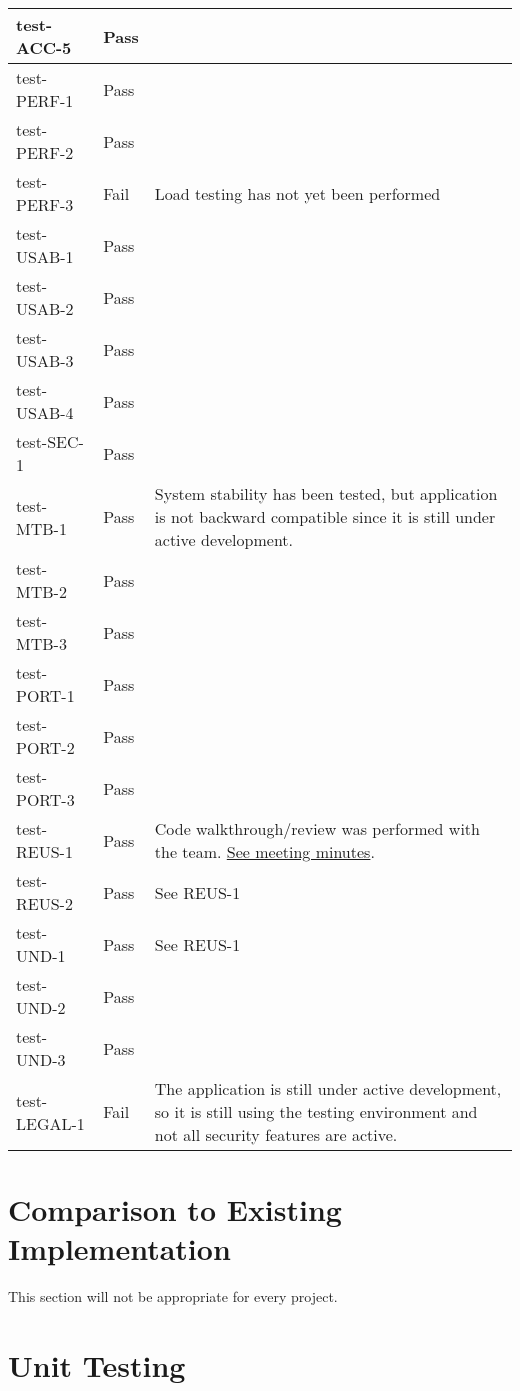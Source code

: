 \documentclass[12pt, titlepage]{article}
\begin{document}
\begin{longtable}{>{\centering\arraybackslash}p{} >{\centering\arraybackslash}p{} >{\centering\arraybackslash}p{}}
    test-ACC-5 & Pass &  \\
    \midrule
    test-PERF-1 & Pass &  \\
    test-PERF-2 & Pass &  \\
    test-PERF-3 & Fail & Load testing has not yet been performed \\
    \midrule
    test-USAB-1 & Pass &  \\
    test-USAB-2 & Pass &  \\
    test-USAB-3 & Pass &  \\
    test-USAB-4 & Pass &  \\
    \midrule
    test-SEC-1 & Pass &  \\
    \midrule
    test-MTB-1 & Pass & System stability has been tested, but application is not
    backward compatible since it is still under active development. \\
    test-MTB-2 & Pass &  \\
    test-MTB-3 & Pass &  \\
    \midrule
    test-PORT-1 & Pass &  \\
    test-PORT-2 & Pass &  \\
    test-PORT-3 & Pass &  \\
    \midrule
    test-REUS-1 & Pass & Code walkthrough/review was performed with the team.
    \href{https://github.com/PlutosCapstone/Plutos/issues/256}{See meeting
    minutes}. \\
    test-REUS-2 & Pass & See REUS-1 \\
    \midrule
    test-UND-1 & Pass & See REUS-1 \\
    test-UND-2 & Pass &  \\
    test-UND-3 & Pass &  \\
    \midrule
    test-LEGAL-1 & Fail & The application is still under active development, so
    it is still using the testing environment and not all security features are
    active. \\
    \bottomrule
\end{longtable}


	
\section{Comparison to Existing Implementation}	

This section will not be appropriate for every project.

\section{Unit Testing}
\end{document}
